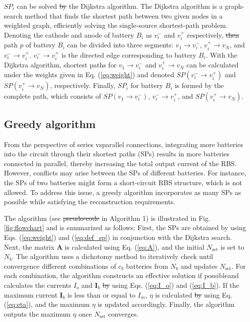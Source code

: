 \documentclass{article}
\providecommand{\DIFadd}[1]{{\protect\color{blue}\uwave{#1}}} %
\providecommand{\DIFdel}[1]{{\protect\color{red}\sout{#1}}}                      %
\providecommand{\DIFaddbegin}{} %
\providecommand{\DIFaddend}{} %
\providecommand{\DIFdelbegin}{} %
\providecommand{\DIFdelend}{} %
\newcommand{\DIFscaledelfig}{0.5}
\newlength{\DIFdelgraphicswidth} %
\newlength{\DIFdelgraphicsheight} %
\newcommand{\DIFaddincludegraphics}[2][]{{\color{blue}\fbox{\DIFOincludegraphics[#1]{#2}}}} %
\newcommand{\DIFdelincludegraphics}[2][]{%
\sbox{\DIFdelgraphicsbox}{\DIFOincludegraphics[#1]{#2}}%
\settoboxwidth{\DIFdelgraphicswidth}{\DIFdelgraphicsbox} %
\settoboxtotalheight{\DIFdelgraphicsheight}{\DIFdelgraphicsbox} %
\scalebox{\DIFscaledelfig}{%
\parbox[b]{\DIFdelgraphicswidth}{\usebox{\DIFdelgraphicsbox}\\[-\baselineskip] \rule{\DIFdelgraphicswidth}{0em}}\llap{\resizebox{\DIFdelgraphicswidth}{\DIFdelgraphicsheight}{%
\setlength{\unitlength}{\DIFdelgraphicswidth}%
\begin{picture}(1,1)%
\thicklines\linethickness{2pt} %
{\color[rgb]{1,0,0}\put(0,0){\framebox(1,1){}}}%
{\color[rgb]{1,0,0}\put(0,0){\line( 1,1){1}}}%
{\color[rgb]{1,0,0}\put(0,1){\line(1,-1){1}}}%
\end{picture}%
}\hspace*{3pt}}} %
} %
\DeclareRobustCommand{\DIFaddbegin}{\DIFOaddbegin \let\includegraphics\DIFaddincludegraphics} %
\DeclareRobustCommand{\DIFaddend}{\DIFOaddend \let\includegraphics\DIFOincludegraphics} %
\DeclareRobustCommand{\DIFdelbegin}{\DIFOdelbegin \let\includegraphics\DIFdelincludegraphics} %
\DeclareRobustCommand{\DIFdelend}{\DIFOaddend \let\includegraphics\DIFOincludegraphics} %
\begin{document}
$SP_i$ can be solved \DIFdelbegin \DIFdel{by }\DIFdelend \DIFaddbegin \DIFadd{using }\DIFaddend the Dijkstra algorithm.
The Dijkstra algorithm is a graph-search method that finds the shortest path between two given nodes in a weighted graph, efficiently solving the single-source shortest-path problem.
Denoting the cathode and anode of battery $B_i$ as $v_i^-$ and $v_i^+$ respectively, \DIFdelbegin \DIFdel{then }\DIFdelend path $p$ of battery $B_i$ can be divided into three segments: $v_1 \rightarrow v_i^-$, $v_i^+ \rightarrow v_N$, and $v_i^- \rightarrow v_i^+$. $v_i^- \rightarrow v_i^+$ is the directed edge corresponding to battery $B_i$. 
With the Dijkstra algorithm, \DIFaddbegin \DIFadd{the }\DIFaddend shortest paths for $v_1 \rightarrow v_i^-$ and $v_i^+ \rightarrow v_N$ can be calculated under the weights given in Eq. (\ref{eq:weight}) and denoted $SP(v_i^- \rightarrow v_i^+)$ and $SP(v_i^+ \rightarrow v_N)$, respectively.
Finally, $SP_i$ for battery $B_i$ is formed by the complete path, which consists of $SP(v_1 \rightarrow v_i^-)$, $v_i^- \rightarrow v_i^+$, and $SP(v_i^+ \rightarrow v_N)$.

\subsection{Greedy algorithm}\label{subsec:greedy_solution}

From the perspective of series vs\DIFaddbegin \DIFadd{. }\DIFaddend parallel connections, integrating more batteries into the circuit through their shortest paths (SPs) results in more batteries connected in parallel, thereby increasing the total output current of the RBS.
However, conflicts may arise between the SPs of different batteries. 
For instance, the SPs of two batteries might form a short-circuit RBS structure, which is not allowed. 
To address this issue, a greedy algorithm incorporates as many SPs as possible while satisfying the reconstruction requirements.

The algorithm (see \DIFdelbegin \DIFdel{pseudo-code }\DIFdelend \DIFaddbegin \DIFadd{the pseudocode }\DIFaddend in Algorithm 1) is illustrated in Fig. \ref{fig:flowchart} and is summarized as follows:
First, the SPs are obtained by using Eqs. (\ref{eq:weight}) and (\ref{eq:def_sp}) in conjunction with the Dijkstra search. 
Next, the matrix $\bm{A}$ is calculated using Eq. (\ref{eq:A}), and the initial $N_{\text{set}}$ is set to $N_b$. 
The algorithm uses a dichotomy method to iteratively check until convergence different combinations of $c_b$ batteries from $N_b$ and updates $N_{\text{set}}$. 
For each combination, the algorithm constructs an effective solution if possible\DIFaddbegin \DIFadd{, }\DIFaddend and calculates the currents $I_o$ and $\bm{I}_b$ \DIFdelbegin \DIFdel{by }\DIFdelend using Eqs. (\ref{eq:I_o}) and (\ref{eq:I_b}). 
If the maximum current $\bm{I}_b$ is less than or equal to $I_m$, $\eta$ is calculated \DIFdelbegin \DIFdel{by }\DIFdelend using Eq. (\ref{eq:eta}), and the maximum $\eta$ is updated accordingly. 
Finally, the algorithm outputs the maximum $\eta$ once $N_{\text{set}}$ converges.
\end{document}
